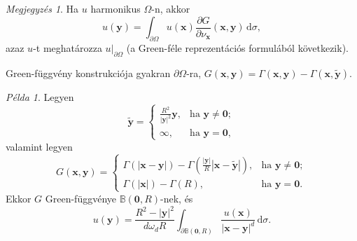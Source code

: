 \documentclass[DIV=15,appendixprefix]{scrreprt}
\theoremstyle{definition}
\theoremstyle{remark}
\newtheorem*{megj}{Megjegyzés}
\newtheorem*{pelda}{Példa}
\newcommand{\ball}{\mathbb{B}}
\begin{document}
\begin{megj}
	Ha $ u $ harmonikus $\Omega$-n, akkor
	\begin{equation*}
		u \left( \mathbf{ y } \right) = \int_{ \partial \Omega } u \left( \mathbf{ x } \right) \frac{ \partial G }{ \partial \nu_{ \mathbf{ x } } } \left( \mathbf{ x },{} \mathbf{ y } \right) \, \mathrm{ d }\sigma,
	\end{equation*}
	azaz $ u $-t meghatározza $ \left. u \right|_{ \partial \Omega } $ (a Green-féle reprezentációs
	formulából következik).
\end{megj}
Green-függvény konstrukciója gyakran  $ \partial \Omega $-ra, $ G \left(
\mathbf{ x },{} \mathbf{ y } \right) = \Gamma \left( \mathbf{ x },{} \mathbf{ y } \right) - \Gamma
\left( \mathbf{ x },{} \tilde{ \mathbf{ y } } \right) $.
\begin{pelda}
	Legyen
	\begin{equation*}
		\tilde{ \mathbf{ y } } = \begin{cases}
			\frac{ R^{ 2 } }{ \left| \mathbf{ y } \right|^{ 2 } } \mathbf{ y }, & \text{ha }
				\mathbf{ y } \neq \mathbf{ 0 };\\
			\infty, & \text{ha } \mathbf{ y } = \mathbf{ 0 },
		\end{cases}
	\end{equation*}
	valamint legyen
	\begin{equation*}
		G \left( \mathbf{ x },{} \mathbf{ y } \right) = \begin{cases}
			\Gamma \left( \left| \mathbf{ x } - \mathbf{ y } \right| \right) - \Gamma \left( \frac{
				\left| \mathbf{ y } \right| }{ R } \left| \mathbf{ x } - \tilde{ \mathbf{ y } }
				\right| \right), & \text{ha } \mathbf{ y } \neq \mathbf{ 0 };\\
			\Gamma \left( \left| \mathbf{ x } \right| \right) - \Gamma \left( R \right), &
				\text{ha } \mathbf{ y } = \mathbf{ 0 }.
		\end{cases}
	\end{equation*}
	Ekkor $ G $ Green-függvénye $ \ball \left( \mathbf{ 0 },{} R \right) $-nek, és
	\begin{equation*}
		u \left( \mathbf{ y } \right) = \frac{ R^{ 2 } - \left| \mathbf{ y } \right|^{ 2 } }{ d
		\omega_{ d } R } \int_{ \partial \ball \left( \mathbf{ 0 },{} R \right) } \frac{ u \left(
		\mathbf{ x } \right)}{ \left| \mathbf{ x } - \mathbf{ y } \right|^{ d } } \,
		\mathrm{ d }\sigma.
	\end{equation*}
\end{pelda}
%
\end{document}
